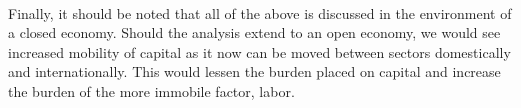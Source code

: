 \\
\indent Finally, it should be noted that all of the above is discussed in the environment of a closed economy. Should the analysis extend to an open economy, we would see increased mobility of capital as it now can be moved between sectors domestically and internationally. This would lessen the burden placed on capital and increase the burden of the more immobile factor, labor.

